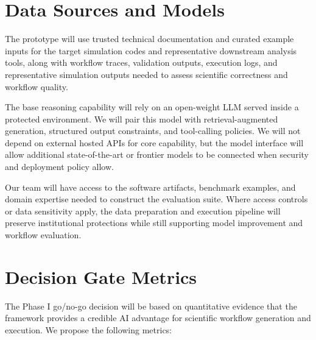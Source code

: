 \documentclass[11pt]{article} \usepackage[margin=1in]{geometry}
\begin{document}
\section{Data Sources and Models} The prototype will use trusted technical
documentation and curated example inputs for the target simulation codes and
representative downstream analysis tools, along with workflow traces, validation
outputs, execution logs, and representative simulation outputs needed to assess
scientific correctness and workflow quality.

The base reasoning capability will rely on an open-weight LLM served inside a
protected environment. We will pair this model with retrieval-augmented
generation, structured output constraints, and tool-calling policies. We will
not depend on external hosted APIs for core capability, but the model interface
will allow additional state-of-the-art or frontier models to be connected when
security and deployment policy allow.

Our team will have access to the software artifacts, benchmark examples, and
domain expertise needed to construct the evaluation suite. Where access controls
or data sensitivity apply, the data preparation and execution pipeline will
preserve institutional protections while still supporting model improvement and
workflow evaluation.

\section{Decision Gate Metrics} The Phase I go/no-go decision will be based on
quantitative evidence that the framework provides a credible AI advantage for
scientific workflow generation and execution. We propose the following metrics:
\end{document}
